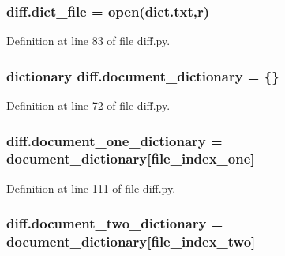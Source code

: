 \subsubsection[{\texorpdfstring{dict\+\_\+file}{dict_file}}]{\setlength{\rightskip}{0pt plus 5cm}diff.\+dict\+\_\+file = open(\textquotesingle{}dict.\+txt\textquotesingle{},\textquotesingle{}r\textquotesingle{})}\hypertarget{namespacediff_a1c4dd03a1a71df999349462c9dd9994d}{}\label{namespacediff_a1c4dd03a1a71df999349462c9dd9994d}


Definition at line 83 of file diff.\+py.

\subsubsection[{\texorpdfstring{document\+\_\+dictionary}{document_dictionary}}]{\setlength{\rightskip}{0pt plus 5cm}dictionary diff.\+document\+\_\+dictionary = \{\}}\hypertarget{namespacediff_a7d02a567fcd601900d3960bef0191cea}{}\label{namespacediff_a7d02a567fcd601900d3960bef0191cea}


Definition at line 72 of file diff.\+py.

\subsubsection[{\texorpdfstring{document\+\_\+one\+\_\+dictionary}{document_one_dictionary}}]{\setlength{\rightskip}{0pt plus 5cm}diff.\+document\+\_\+one\+\_\+dictionary = {\bf document\+\_\+dictionary}\mbox{[}{\bf file\+\_\+index\+\_\+one}\mbox{]}}\hypertarget{namespacediff_aa4da046a613de2dafe03d105bca31694}{}\label{namespacediff_aa4da046a613de2dafe03d105bca31694}


Definition at line 111 of file diff.\+py.

\subsubsection[{\texorpdfstring{document\+\_\+two\+\_\+dictionary}{document_two_dictionary}}]{\setlength{\rightskip}{0pt plus 5cm}diff.\+document\+\_\+two\+\_\+dictionary = {\bf document\+\_\+dictionary}\mbox{[}{\bf file\+\_\+index\+\_\+two}\mbox{]}}\hypertarget{namespacediff_a00ac707250a54a82a970c2bb2acf736a}{}\label{namespacediff_a00ac707250a54a82a970c2bb2acf736a}


